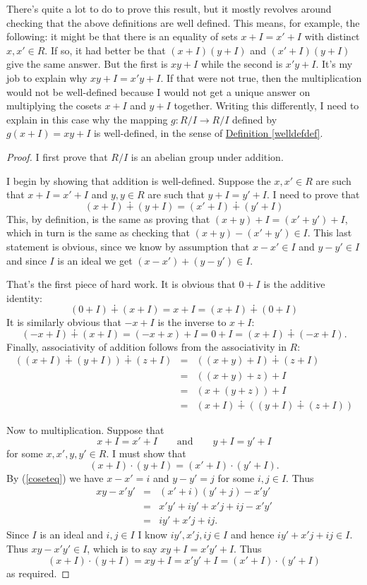 \documentclass[11pt]{amsbook}
\theoremstyle{definition}
\begin{document}
There's quite a lot to do to prove this result, but it mostly revolves around checking that the above definitions are well defined. This means, for example, the following: it might be that there is an equality of sets $x+I = x'+I$ with distinct $x, x' \in R$. If so, it had better be that $(x+I)(y+I)$ and $(x'+I)(y+I)$ give the same answer. But the first is $xy+I$ while the second is $x'y+I$. It's my job to explain why $xy+I = x'y +I$. If that were not true, then the multiplication would not be well-defined because I would not get a unique answer on multiplying the cosets $x+I$ and $y+I$ together. Writing this differently, I need to explain in this case why the mapping $g: R/I \to R/I$ defined by $g(x+I) = xy +I$ is well-defined, in the sense of \hyperref[welldefdef]{Definition \ref{welldefdef}}.
\begin{proof}
I first prove that $R/I$ is an abelian group under addition.

I begin by showing that addition is well-defined. Suppose the $x,x'\in R$ are such that $x+I = x'+I$ and $y,y\in R$ are such that $y+I = y'+I$. I need to prove that $$(x+I) \dotplus (y+I) = (x'+I) \dotplus (y'+I)$$ This, by definition, is the same as proving that $(x+y)+I = (x'+y')+I$, which in turn is the same as checking that $(x+y)-(x'+y') \in I$. This last statement is obvious, since we know by assumption that $x-x'\in I$ and $y-y'\in I$ and since $I$ is an ideal we get $(x-x') + (y-y')\in I$.

That's the first piece of hard work. It is obvious that $0+I$ is the additive identity: $$(0+I) \dotplus (x+I) = x+I = (x+I)\dotplus (0+I)$$ It is similarly obvious that $-x + I$ is the inverse to $x+I$: $$(-x+I) \dotplus (x+I) = (-x + x) + I = 0 +I = (x+I) \dotplus (-x+I).$$ Finally, associativity of addition follows from the associativity in $R$: \begin{eqnarray*} ((x+I)\dotplus(y+I))\dotplus (z+I) &=& ((x+y)+I) \dotplus (z+I) \\ &=& ((x+y)+z)+I \\ &=& (x+(y+z))+I \\ &=& (x+I)\dotplus((y+I)\dotplus (z+I))\end{eqnarray*}

Now to multiplication. Suppose that \begin{equation} \label{coseteq} x+ I = x' + I \qquad \text{and} \qquad y+ I = y' + I\end{equation} for some $x,x',y,y' \in R$. I must show that \begin{equation*} (x+I)\cdot (y+ I ) = (x' +I)\cdot (y'+I).\end{equation*}
By (\ref{coseteq}) we have $x-x' = i$ and $y-y' = j$ for some $i,j\in I$. Thus
\begin{eqnarray*} xy - x'y'&= &(x' +i) (y'+j) - x'y' \\ & = & x'y' + iy' + x'j + ij - x'y' \\ & = & iy' + x'j + ij . \end{eqnarray*}  Since $I$ is an ideal and $i,j\in I$ I know $iy', x'j, ij \in I$ and hence $iy' + x'j +ij \in I$. Thus $xy - x'y' \in I$, which is to say $xy + I = x'y' +I$. Thus $$ (x+I)\cdot (y+I) = xy + I = x'y' + I = (x'+I)\cdot (y'+I)$$ as required.


\end{proof}
\end{document}
